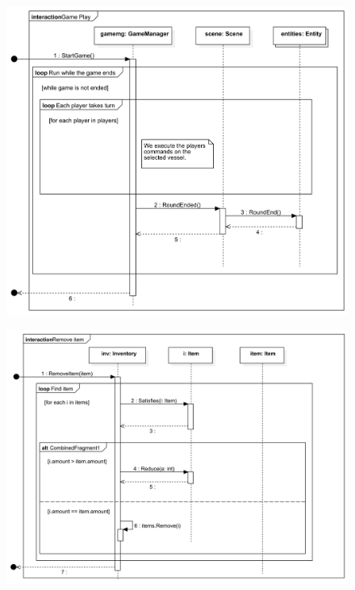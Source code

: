 \begin{figure}[H] 
\centering 
\includegraphics[width=1\textwidth]{docs/3_Project/svg/Design Model!Game play!Game Play!Game Play_28.png} 
\end{figure} 

\begin{figure}[H] 
\centering 
\includegraphics[width=1\textwidth]{docs/3_Project/svg/Design Model!Inventory!Interaction1!Remove item_29.png} 
\end{figure} 

